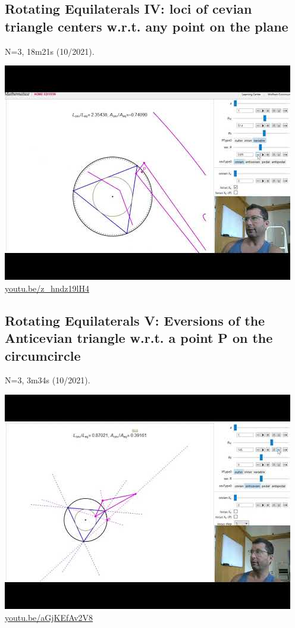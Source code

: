 \documentclass[12pt]{amsart}
\begin{document}
\subsection{Rotating Equilaterals IV: loci of cevian triangle centers w.r.t. any point on the plane}
\label{vid:z_hndz19lH4}
\noindent N=3, 18m21s (10/2021). 
\begin{center}\includegraphics[width=.5\textwidth]{pics/z_hndz19lH4.jpg} \\ 
\href{https://youtu.be/z_hndz19lH4}{\url{youtu.be/z\_hndz19lH4}}\end{center}
% 
\subsection{Rotating Equilaterals V: Eversions of the Anticevian triangle w.r.t. a point P on the circumcircle}
\label{vid:aGjKEfAv2V8}
\noindent N=3, 3m34s (10/2021). 
\begin{center}\includegraphics[width=.5\textwidth]{pics/aGjKEfAv2V8.jpg} \\ 
\href{https://youtu.be/aGjKEfAv2V8}{\url{youtu.be/aGjKEfAv2V8}}\end{center}
% 
\end{document}
